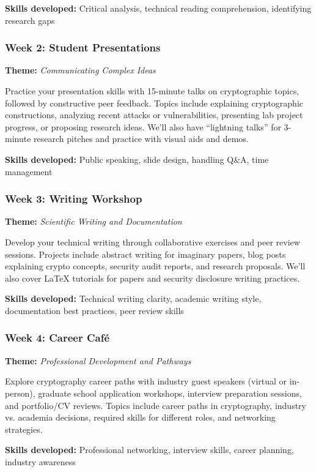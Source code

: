 \documentclass[10pt,a4paper,american]{exam}
\begin{document}
\textbf{Skills developed:} Critical analysis, technical reading comprehension, identifying research gaps

\subsubsection*{Week 2: Student Presentations}
\textbf{Theme:} \textit{Communicating Complex Ideas}

Practice your presentation skills with 15-minute talks on cryptographic topics, followed by constructive peer feedback. Topics include explaining cryptographic constructions, analyzing recent attacks or vulnerabilities, presenting lab project progress, or proposing research ideas. We'll also have ``lightning talks'' for 3-minute research pitches and practice with visual aids and demos.

\textbf{Skills developed:} Public speaking, slide design, handling Q\&A, time management

\subsubsection*{Week 3: Writing Workshop}
\textbf{Theme:} \textit{Scientific Writing and Documentation}

Develop your technical writing through collaborative exercises and peer review sessions. Projects include abstract writing for imaginary papers, blog posts explaining crypto concepts, security audit reports, and research proposals. We'll also cover LaTeX tutorials for papers and security disclosure writing practices.

\textbf{Skills developed:} Technical writing clarity, academic writing style, documentation best practices, peer review skills

\subsubsection*{Week 4: Career Café}
\textbf{Theme:} \textit{Professional Development and Pathways}

Explore cryptography career paths with industry guest speakers (virtual or in-person), graduate school application workshops, interview preparation sessions, and portfolio/CV reviews. Topics include career paths in cryptography, industry vs. academia decisions, required skills for different roles, and networking strategies.

\textbf{Skills developed:} Professional networking, interview skills, career planning, industry awareness
\end{document}

